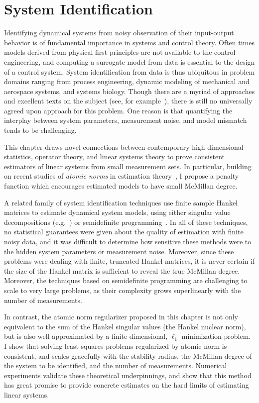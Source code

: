 \chapter{System Identification}
\label{chap:sysid}

Identifying dynamical systems from noisy observation of their input-output
behavior is of fundamental importance in systems and control theory. Often times
models derived from physical first principles are not available to the control
engineering, and computing a surrogate model from data is essential to the
design of a control system. System identification from data is thus ubiquitous
in problem domains ranging from process engineering, dynamic modeling of
mechanical and aerospace systems, and systems biology. Though there are a myriad
of approaches and excellent texts on the subject (see, for
example~\cite{LjungBook}), there is still no universally agreed upon approach
for this problem. One reason is that quantifying the interplay between system
parameters, measurement noise, and model mismatch tends to be challenging.

This chapter draws novel connections between contemporary high-dimensional
statistics, operator theory, and linear systems theory to prove consistent
estimators of linear systems from small measurement sets. In particular,
building on recent studies of \emph{atomic norms} in estimation
theory~\cite{crpw,btr12}, I propose a penalty function which encourages
estimated models to have small McMillan degree.

A related family of system identification techniques use finite sample Hankel
matrices to estimate dynamical system models, using either singular value
decompositions (e.g,~\cite{Verhaegen92,Overschee94}) or semidefinite
programming~\cite{Fazel01,Liu08,Smith12,recht07}. In all of these techniques,
no statistical guarantees were given about the quality of estimation with
finite noisy data, and it was difficult to determine how sensitive these
methods were to the hidden system parameters or measurement noise. Moreover,
since these problems were dealing with finite, truncated Hankel matrices, it is
never certain if the size of the Hankel matrix is sufficient to reveal the true
McMillan degree. Moreover, the techniques based on semidefinite programming are
challenging to scale to very large problems, as their complexity grows
superlinearly with the number of measurements.

In contrast, the atomic norm regularizer proposed in this chapter is not only
equivalent to the sum of the Hankel singular values (the Hankel nuclear norm),
but is also well approximated by a finite dimensional, $\ell_1$ minimization
problem. I show that solving least-squares problems regularized by atomic
norm is consistent, and scales gracefully with the stability radius, the
McMillan degree of the system to be identified, and the number of measurements.
Numerical experiments validate these theoretical underpinnings, and show
that this method has great promise to provide concrete estimates on the hard
limits of estimating linear systems.

